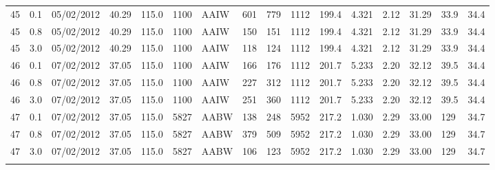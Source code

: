 {\begin{landscape}
\begin{longtable}{llllllllllllllll}
45 & 0.1 & 05/02/2012 & \textminus{}40.29 & 115.0 & 1100 & AAIW & 601 & 779 & 1112 & 199.4 & 4.321 & 2.12 & 31.29 & 33.9 & 34.4\\
45 & 0.8 & 05/02/2012 & \textminus{}40.29 & 115.0 & 1100 & AAIW & 150 & 151 & 1112 & 199.4 & 4.321 & 2.12 & 31.29 & 33.9 & 34.4\\
45 & 3.0 & 05/02/2012 & \textminus{}40.29 & 115.0 & 1100 & AAIW & 118 & 124 & 1112 & 199.4 & 4.321 & 2.12 & 31.29 & 33.9 & 34.4\\
46 & 0.1 & 07/02/2012 & \textminus{}37.05 & 115.0 & 1100 & AAIW & 166 & 176 & 1112 & 201.7 & 5.233 & 2.20 & 32.12 & 39.5 & 34.4\\
46 & 0.8 & 07/02/2012 & \textminus{}37.05 & 115.0 & 1100 & AAIW & 227 & 312 & 1112 & 201.7 & 5.233 & 2.20 & 32.12 & 39.5 & 34.4\\
46 & 3.0 & 07/02/2012 & \textminus{}37.05 & 115.0 & 1100 & AAIW & 251 & 360 & 1112 & 201.7 & 5.233 & 2.20 & 32.12 & 39.5 & 34.4\\
47 & 0.1 & 07/02/2012 & \textminus{}37.05 & 115.0 & 5827 & AABW & 138 & 248 & 5952 & 217.2 & 1.030 & 2.29 & 33.00 & 129 & 34.7\\
47 & 0.8 & 07/02/2012 & \textminus{}37.05 & 115.0 & 5827 & AABW & 379 & 509 & 5952 & 217.2 & 1.030 & 2.29 & 33.00 & 129 & 34.7\\
47 & 3.0 & 07/02/2012 & \textminus{}37.05 & 115.0 & 5827 & AABW & 106 & 123 & 5952 & 217.2 & 1.030 & 2.29 & 33.00 & 129 & 34.7\\
\bottomrule
\label{tab:advectionfullsampledata}
\end{longtable}
\end{landscape}
}

